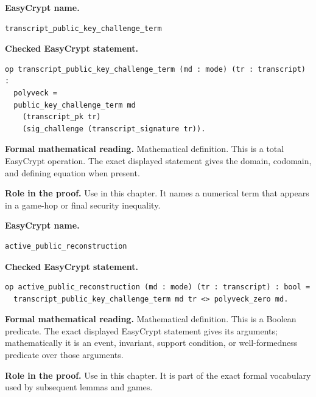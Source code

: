 \begin{formaldefinition}
\noindent\textbf{EasyCrypt name.}
\begin{lstlisting}[language=EasyCrypt,basicstyle=\ttfamily\scriptsize]
transcript_public_key_challenge_term
\end{lstlisting}
\noindent\textbf{Checked EasyCrypt statement.}
\begin{lstlisting}[language=EasyCrypt,basicstyle=\ttfamily\scriptsize]
op transcript_public_key_challenge_term (md : mode) (tr : transcript) :
  polyveck =
  public_key_challenge_term md
    (transcript_pk tr)
    (sig_challenge (transcript_signature tr)).
\end{lstlisting}
\noindent\textbf{Formal mathematical reading.}
Mathematical definition. This is a total EasyCrypt operation.  The exact displayed statement gives the domain, codomain, and defining equation when present.

\noindent\textbf{Role in the proof.}
Use in this chapter. It names a numerical term that appears in a game-hop or final security inequality.

\end{formaldefinition}

\begin{formaldefinition}
\noindent\textbf{EasyCrypt name.}
\begin{lstlisting}[language=EasyCrypt,basicstyle=\ttfamily\scriptsize]
active_public_reconstruction
\end{lstlisting}
\noindent\textbf{Checked EasyCrypt statement.}
\begin{lstlisting}[language=EasyCrypt,basicstyle=\ttfamily\scriptsize]
op active_public_reconstruction (md : mode) (tr : transcript) : bool =
  transcript_public_key_challenge_term md tr <> polyveck_zero md.
\end{lstlisting}
\noindent\textbf{Formal mathematical reading.}
Mathematical definition. This is a Boolean predicate.  The exact displayed EasyCrypt statement gives its arguments; mathematically it is an event, invariant, support condition, or well-formedness predicate over those arguments.

\noindent\textbf{Role in the proof.}
Use in this chapter. It is part of the exact formal vocabulary used by subsequent lemmas and games.

\end{formaldefinition}

